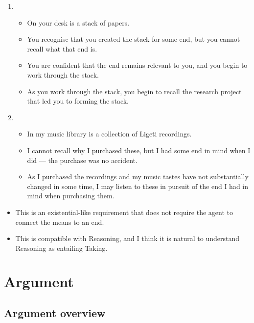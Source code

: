 \documentclass[10pt]{article}
\newcommand{\hozlinedash}[0]{%
  \noindent\hdashrule[0.5ex][c]{\textwidth}{.1pt}{2.5pt}
}
\newcommand{\schemaName}[1]{\textsf{#1}}
\begin{document}
\begin{enumerate}[label=\Alph*., ref=(\Alph*)]
\item \begin{itemize}[noitemsep]
  \item On your desk is a stack of papers.
  \item You recognise that you created the stack for some end, but you cannot recall what that end is.
  \item You are confident that the end remains relevant to you, and you begin to work through the stack.
  \item As you work through the stack, you begin to recall the research project that led you to forming the stack.
  \end{itemize}

\item \begin{itemize}[noitemsep]
  \item In my music library is a collection of Ligeti recordings.
  \item I cannot recall why I purchased these, but I had some end in mind when I did --- the purchase was no accident.
  \item As I purchased the recordings and my music tastes have not substantially changed in some time, I may listen to these in pursuit of the end I had in mind when purchasing them.
  \end{itemize}
\end{enumerate}

\begin{itemize}
\item This is an existential-like requirement that does not require the agent to connect the means to an end.
\item This is compatible with \schemaName{Reasoning}, and I think it is natural to understand \schemaName{Reasoning} as entailing \schemaName{Taking}.
\end{itemize}

\hozlinedash

\newpage

\section{Argument}
\label{sec:argument}

\subsection{Argument overview}
\label{sec:argument-overview}
\end{document}
